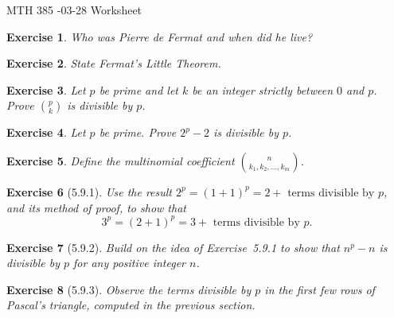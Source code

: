 \documentclass[12pt]{article}
\theoremstyle{plain}
\newtheorem{ex}{Exercise}
\begin{document}
MTH 385 -03-28 Worksheet

\begin{ex}
  Who was Pierre de Fermat and when did he live?
\end{ex}

\begin{ex}
  State Fermat's Little Theorem.
\end{ex}

\begin{ex}
  Let $p$ be prime and let $k$ be an integer strictly between $0$ and $p$. Prove $\displaystyle\binom{p}{k}$ is divisible by $p$.
\end{ex}

\begin{ex}
  Let $p$ be prime. Prove $2^p-2$ is divisible by $p$.
\end{ex}

\begin{ex}
  Define the \emph{multinomial coefficient} $\displaystyle\binom{n}{k_1,k_2,\ldots,k_m}$.
\end{ex}

\begin{ex} [5.9.1]
  Use the result $2^p=(1+1)^p=2+\text{ terms divisible by }p$, and its method of proof, to show that
  \[
    3^p=(2+1)^p=3+\text{ terms divisible by }p.
  \]
\end{ex}

\begin{ex} [5.9.2]
  Build on the idea of Exercise~5.9.1 to show that $n^p-n$ is divisible by $p$ for any positive integer $n$.
\end{ex}

\begin{ex} [5.9.3]
  Observe the terms divisible by $p$ in the first few rows of Pascal's triangle, computed in the previous section.
\end{ex}
\end{document}
